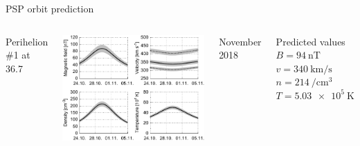 \begin{frame}[c]{PSP orbit prediction}{}
	\begin{columns}[c]
		
		\centering
		Perihelion \#1 at 36.7~\Rs\\\ 
		
		\includegraphics[width=\textwidth]{../figures_paper/SPP_perihelia_prediction_f_plot.pdf}
		
		November 2018

		
		\begin{block}{Predicted values}
			$B = \SI{94}{\nano\tesla}$\\
			$v = \SI{340}{\km\per\s}$\\
			$n = \SI{214}{\per\cm\cubed}$\\
			$T = \SI{5.03e5}{\kelvin}$
		\end{block}
	
	\end{columns}
\end{frame}
